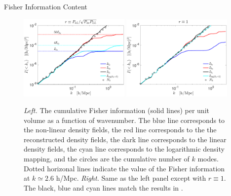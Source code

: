 \begin{section}{Fisher Information Content}
  \begin{figure}
    \includegraphics[width=0.48\textwidth]{fig4a.pdf}
    \includegraphics[width=0.48\textwidth]{fig4b.pdf}
    \centering
    \caption{{\it Left.} The cumulative Fisher information (solid lines) per unit volume as
      a function of wavenumber.  The blue line corresponds to the
      non-linear density fields, the red line corresponds
      to the the reconstructed density fields, the dark line
      corresponds to the linear density fields, the cyan line
      corresponds to the logarithmic density mapping, and the circles
      are the cumulative number of $k$ modes.  Dotted horizonal lines indicate the value of the 
      Fisher information at $k \simeq 2.6$ h/Mpc.  {\it Right.} Same
      as the left panel except with $r\equiv 1$. The black, blue and cyan lines
      match the results in \cite{bib:Rimes2006,bib:Mark2009}.}
  \label{fig:fisherinfo}
\end{figure}
\end{section}
